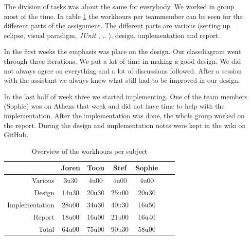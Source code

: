 \documentclass[i2]{oss}
\newcommand{\junit}{\emph{JUnit }}
\begin{document}
The division of tasks was about the same for everybody. We worked in group most of the time. In table \ref{tab:werkuren} the workhours per teammember can be seen for the different parts of the assignment. The different parts are various (setting up eclipse, visual paradigm, \junit, .. ), design, implementation and report. 

In the first weeks the emphasis was place on the design. Our classdiagram went through three iterations. We put a lot of time in making a good design. We did not always agree on everything and a lot of discussions followed. After a session with the assistant we always knew what still had to be improved in our design.

In the last half of week three we started implementing. One of the team members (Sophie) was on Athens that week and did not have time to help with the implementation. After the implementation was done, the whole group worked on the report. During the design and implementation notes were kept in the wiki on GitHub.


\begin{table}[h!]
\begin{center}
    \begin{tabular}{ r | c  c  c  c  c  c}
     & Joren & Toon & Stef & Sophie \\ \hline
    	Various & 		3u30 & 4u00 & 4u00 & 4u00\\
        Design & 		14u30 & 20u30 & 25u00 & 20u30 \\
        Implementation & 28u00 & 34u30 & 40u30 & 16u50\\
        Report & 		18u00 & 16u00 & 21u00 & 16u40 \\
        Total & 		64u00 & 75u00 & 90u30 & 58u00  
    \end{tabular}
    \caption{Overview of the workhours per subject}
    \label{tab:werkuren}
\end{center}
\end{table}
\end{document}
